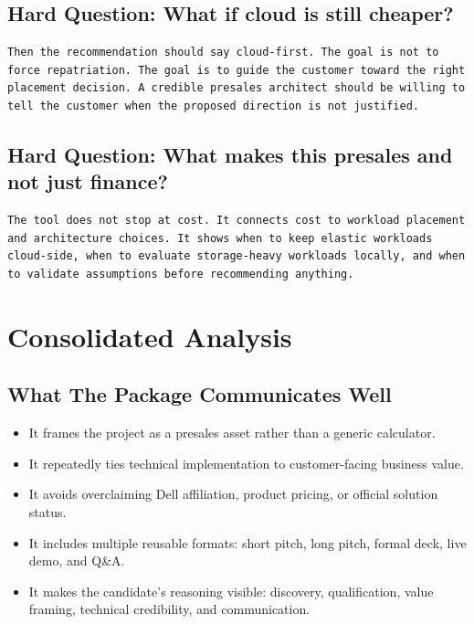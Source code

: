 \documentclass[11pt,a4paper]{article}
\begin{document}
\subsection{Hard Question: What if cloud is still cheaper?}

\begin{lstlisting}
Then the recommendation should say cloud-first. The goal is not to force repatriation. The goal is to guide the customer toward the right placement decision. A credible presales architect should be willing to tell the customer when the proposed direction is not justified.
\end{lstlisting}

\subsection{Hard Question: What makes this presales and not just finance?}

\begin{lstlisting}
The tool does not stop at cost. It connects cost to workload placement and architecture choices. It shows when to keep elastic workloads cloud-side, when to evaluate storage-heavy workloads locally, and when to validate assumptions before recommending anything.
\end{lstlisting}

\section{Consolidated Analysis}

\subsection{What The Package Communicates Well}

\begin{itemize}
  \item It frames the project as a presales asset rather than a generic calculator.
  \item It repeatedly ties technical implementation to customer-facing business value.
  \item It avoids overclaiming Dell affiliation, product pricing, or official solution status.
  \item It includes multiple reusable formats: short pitch, long pitch, formal deck, live demo, and Q\&A.
  \item It makes the candidate's reasoning visible: discovery, qualification, value framing, technical credibility, and communication.
\end{itemize}
\end{document}

